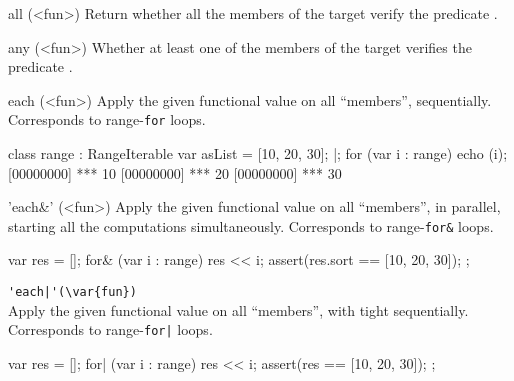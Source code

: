 \begin{urbiscriptapi}
\item[all](<fun>)
  Return whether all the members of the target verify the predicate
  .


\item[any](<fun>)
  Whether at least one of the members of the target verifies the
  predicate .


\item[each](<fun>)%
  Apply the given functional value  on all ``members'',
  sequentially.  Corresponds to range-\lstinline|for| loops.
\begin{urbiscript}[firstnumber=1]
class range : RangeIterable
{
  var asList = [10, 20, 30];
}|;
for (var i : range)
  echo (i);
[00000000] *** 10
[00000000] *** 20
[00000000] *** 30
\end{urbiscript}

\item['each&'](<fun>)%
  Apply the given functional value  on all ``members'', in
  parallel, starting all the computations simultaneously.  Corresponds
  to range-\lstinline|for&| loops.
\begin{urbiscript}
{
  var res = [];
  for& (var i : range)
    res << i;
  assert(res.sort == [10, 20, 30]);
};
\end{urbiscript}

\item \lstinline='each|'(\var{fun})=\\%
  Apply the given functional value  on all ``members'', with
  tight sequentially.  Corresponds to range-\lstinline'for|' loops.
\begin{urbiscript}
{
  var res = [];
  for| (var i : range)
    res << i;
  assert(res == [10, 20, 30]);
};
\end{urbiscript}
\end{urbiscriptapi}


